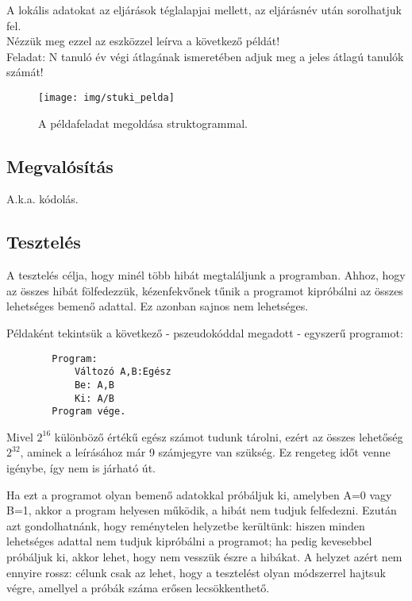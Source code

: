 \documentclass[margin=0px]{article}
\begin{document}
\noindent A lokális adatokat az eljárások téglalapjai mellett, az eljárásnév után sorolhatjuk fel.\\

\noindent Nézzük meg ezzel az eszközzel leírva a következő példát!\\

\noindent Feladat: N tanuló év végi átlagának ismeretében adjuk meg a jeles átlagú tanulók számát!

\begin{figure}[H]
    \centering
    \texttt{[image: img/stuki\_pelda]}
    \caption{A példafeladat megoldása struktogrammal.}
    \label{fig:stuki_pelda}
\end{figure}

\subsection{Megvalósítás}

A.k.a. kódolás.
\subsection{Tesztelés}
A tesztelés célja, hogy minél több hibát megtaláljunk a programban. Ahhoz, hogy az összes hibát fölfedezzük, kézenfekvőnek tűnik a programot kipróbálni az összes lehetséges bemenő adattal. Ez azonban sajnos nem lehetséges.

\noindent Példaként tekintsük a következő - pszeudokóddal megadott - egyszerű programot:

\begin{verbatim}
		Program:
		    Változó A,B:Egész
		   	Be: A,B
		    Ki: A/B
		Program vége.
		\end{verbatim}

Mivel $2^{16}$ különböző értékű egész számot tudunk tárolni, ezért az összes lehetőség $2^{32}$, aminek a leírásához már 9 számjegyre van szükség. Ez rengeteg időt venne igénybe, így nem is járható út.

Ha ezt a programot olyan bemenő adatokkal próbáljuk ki, amelyben A=0 vagy B=1, akkor a program helyesen működik, a hibát nem tudjuk felfedezni. Ezután azt gondolhatnánk, hogy reménytelen helyzetbe kerültünk: hiszen minden lehetséges adattal nem tudjuk kipróbálni a programot; ha pedig kevesebbel próbáljuk ki, akkor lehet, hogy nem vesszük észre a hibákat. A helyzet azért nem ennyire rossz: célunk csak az lehet, hogy a tesztelést olyan módszerrel hajtsuk végre, amellyel a próbák száma erősen lecsökkenthető.\\
\end{document}
